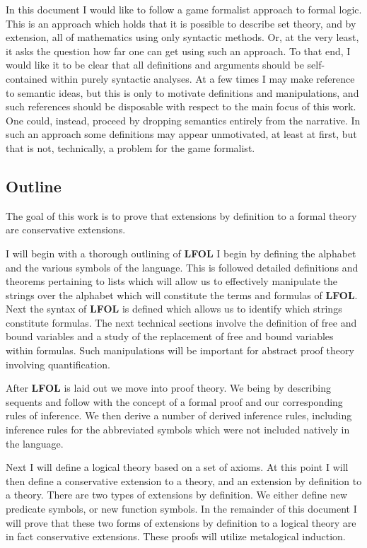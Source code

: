 \documentclass[12pt]{article}
\theoremstyle{break}
\theoremstyle{break}
\theoremstyle{break}
\theoremstyle{break}
\theoremstyle{break}
\newtheorem{informal definition}[definition]{Informal Definition}
\begin{document}
In this document I would like to follow a game formalist approach to formal logic.
This is an approach which holds that it is possible to describe set theory, and by extension, all of mathematics using only syntactic methods.
Or, at the very least, it asks the question how far one can get using such an approach.
To that end, I would like it to be clear that all definitions and arguments should be self-contained within purely syntactic analyses.
At a few times I may make reference to semantic ideas, but this is only to motivate definitions and manipulations, and such references should be disposable with respect to the main focus of this work.
One could, instead, proceed by dropping semantics entirely from the narrative.
In such an approach some definitions may appear unmotivated, at least at first, but that is not, technically, a problem for the game formalist.

\subsection{Outline}

The goal of this work is to prove that extensions by definition to a formal theory are conservative extensions.

I will begin with a thorough outlining of \textbf{LFOL}
I begin by defining the alphabet and the various symbols of the language.
This is followed detailed definitions and theorems pertaining to lists which will allow us to effectively manipulate the strings over the alphabet which will constitute the terms and formulas of \textbf{LFOL}.
Next the syntax of \textbf{LFOL} is defined which allows us to identify which strings constitute formulas.
The next technical sections involve the definition of free and bound variables and a study of the replacement of free and bound variables within formulas.
Such manipulations will be important for abstract proof theory involving quantification.

After \textbf{LFOL} is laid out we move into proof theory.
We being by describing sequents and follow with the concept of a formal proof and our corresponding rules of inference.
We then derive a number of derived inference rules, including inference rules for the abbreviated symbols which were not included natively in the language.

Next I will define a logical theory based on a set of axioms.
At this point I will then define a conservative extension to a theory, and an extension by definition to a theory.
There are two types of extensions by definition.
We either define new predicate symbols, or new function symbols.
In the remainder of this document I will prove that these two forms of extensions by definition to a logical theory are in fact conservative extensions.
These proofs will utilize metalogical induction.
\end{document}
